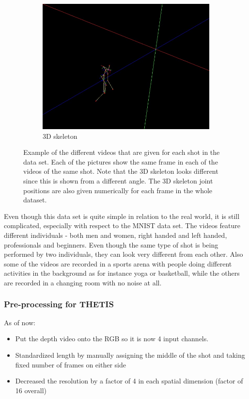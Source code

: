 \begin{figure}
\begin{subfigure}{.32\linewidth}
        \includegraphics[width=\linewidth]{Pics/04_Data/frame53_skelet3D.jpg}
        \caption{3D skeleton}
    \end{subfigure}
    \caption{Example of the different videos that are given for each shot in the data set. Each of the pictures show the same frame in each of the videos of the same shot. Note that the 3D skeleton looks different since this is shown from a different angle. The 3D skeleton joint positions are also given numerically for each frame in the whole dataset.}
    \label{fig:exampleVideosTennis}
\end{figure}

Even though this data set is quite simple in relation to the real world, it is still complicated, especially with respect to the MNIST data set. The videos feature different individuals - both men and women, right handed and left handed, professionals and beginners. Even though the same type of shot is being performed by two individuals, they can look very different from each other. Also some of the videos are recorded in a sports arena with people doing different activities in the background as for instance yoga or basketball, while the others are recorded in a changing room with no noise at all.

\subsubsection{Pre-processing for THETIS}
As of now:
\begin{itemize}
    \item Put the depth video onto the RGB so it is now 4 input channels.
    \item Standardized length by manually assigning the middle of the shot and taking fixed number of frames on either side
    \item Decreased the resolution by a factor of 4 in each spatial dimension (factor of 16 overall)
\end{itemize}